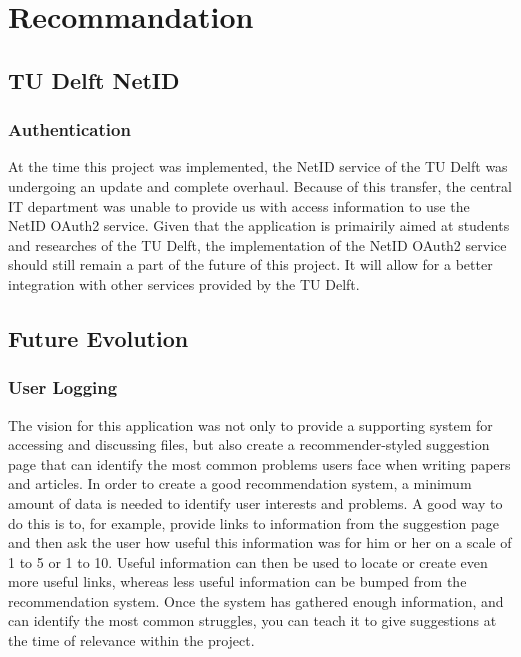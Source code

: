 \chapter{Recommandation}
\section{TU Delft NetID}

\subsection{Authentication}

At the time this project was implemented, the NetID service of the TU Delft was undergoing an update and complete overhaul. 
Because of this transfer, the central IT department was unable to provide us with access information to use the NetID OAuth2 service.
Given that the application is primairily aimed at students and researches of the TU Delft, the implementation of the NetID
OAuth2 service should still remain a part of the future of this project. It will allow for a better integration with other
services provided by the TU Delft.

\section{Future Evolution}

\subsection{User Logging}

The vision for this application was not only to provide a supporting system for accessing and discussing files, but also create
a recommender-styled suggestion page that can identify the most common problems users face when writing papers and articles.
In order to create a good recommendation system, a minimum amount of data is needed to identify user interests and problems.
A good way to do this is to, for example, provide links to information from the suggestion page and then ask the user
how useful this information was for him or her on a scale of 1 to 5 or 1 to 10. Useful information can then be used to locate
or create even more useful links, whereas less useful information can be bumped from the recommendation system. Once the system
has gathered enough information, and can identify the most common struggles, you can teach it to give suggestions at the time
of relevance within the project. 